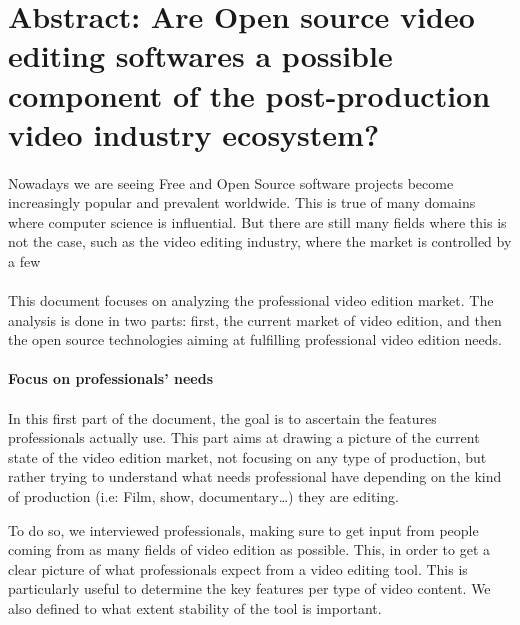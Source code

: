 \newpage\section*{Abstract: Are Open source video editing softwares
a possible
        component of the post-production video industry ecosystem?}

\paragraph{}

Nowadays we are seeing Free and Open Source software projects become
increasingly popular and prevalent worldwide. This is true of many
domains where computer science is influential. But there are still many
fields where this is not the case, such as the video editing industry,
where the market is controlled by a few %

\paragraph{}

This document focuses on analyzing the professional video edition
market. The analysis is done in two parts: first, the current market of
video edition, and then the open source technologies aiming at fulfilling
professional video edition needs.


\paragraph{Focus on professionals' needs}

\paragraph{}

In this first part of the document, the goal is to ascertain the features
professionals actually use. This part aims at drawing a picture of the
current state of the video edition market, not focusing on any type of
production, but rather trying to understand what needs professional have
depending on the kind of production (i.e: Film, show, documentary\ldots)
they are editing.

To do so, we interviewed professionals, making sure to get input from
people coming from as many fields of video edition as possible. This,
in order to get a clear picture of what professionals expect from a video
editing tool.  This is particularly useful to determine the key features
per type of video content.  We also defined to what extent stability of
the tool is important.


